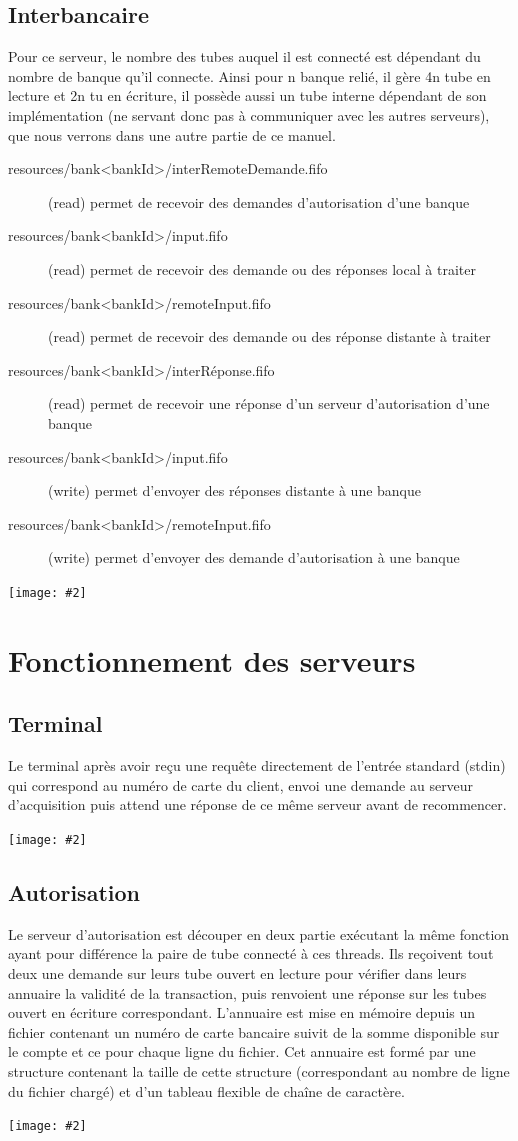 \documentclass[french, a4paper, 12pt, titlepage]{article}
\newcommand{\graph}[2]{
\medskip
	\begin{center}
		\texttt{[image: \#2]}
	\end{center}
\medskip
}
\begin{document}
\subsection{Interbancaire}
Pour ce serveur, le nombre des tubes auquel il est connecté est dépendant du nombre de banque qu'il connecte.
Ainsi pour n banque relié, il gère 4n tube en lecture et 2n tu en écriture, il possède aussi un tube interne dépendant de son implémentation (ne servant donc pas à communiquer avec les autres serveurs), que nous verrons dans une autre partie de ce manuel.

\begin{description}
	\item[resources/bank<bankId>/interRemoteDemande.fifo] (read) permet de recevoir des demandes d'autorisation d'une banque
	\item[resources/bank<bankId>/input.fifo] (read) permet de recevoir des demande ou des réponses local à traiter
	\item[resources/bank<bankId>/remoteInput.fifo] (read) permet de recevoir des demande ou des réponse distante à traiter
	\item[resources/bank<bankId>/interRéponse.fifo] (read) permet de recevoir une réponse d'un serveur d'autorisation d'une banque
	\item[resources/bank<bankId>/input.fifo] (write) permet d'envoyer des réponses distante à une banque
	\item[resources/bank<bankId>/remoteInput.fifo] (write) permet d'envoyer des demande d'autorisation à une banque
\end{description}
\graph{0.5}{interbancaire}

\section{Fonctionnement des serveurs}
\subsection{Terminal}
Le terminal après avoir reçu une requête directement de l'entrée standard (stdin) qui correspond au numéro de carte du client, envoi une demande au serveur d'acquisition puis attend une réponse de ce même serveur avant de recommencer.
\graph{0.4}{terminalState}

\subsection{Autorisation}
Le serveur d'autorisation est découper en deux partie exécutant la même fonction ayant pour différence la paire de tube connecté à ces threads.
Ils reçoivent tout deux une demande sur leurs tube ouvert en lecture pour vérifier dans leurs annuaire la validité de la transaction, puis renvoient une réponse sur les tubes ouvert en écriture correspondant.
L'annuaire est mise en mémoire depuis un fichier contenant un numéro de carte bancaire suivit de la somme disponible sur le compte et ce pour chaque ligne du fichier.
Cet annuaire est formé par une structure contenant la taille de cette structure (correspondant au nombre de ligne du fichier chargé) et d'un tableau flexible de chaîne de caractère.
\graph{0.4}{autorisationState}
\end{document}
